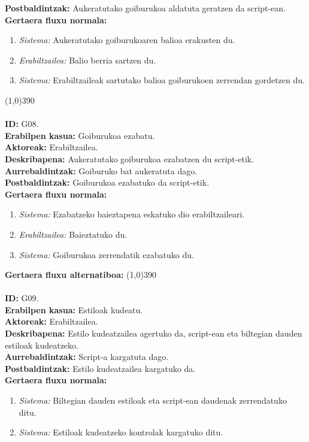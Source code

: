 \textbf{Postbaldintzak:} Aukeratutako goiburukoa aldatuta geratzen da script-ean.\\
\textbf{Gertaera fluxu normala:}
\begin{enumerate}
	\item \textit{Sistema:} Aukeratutako goiburukoaren balioa erakusten du.
	\item \textit{Erabiltzailea:} Balio berria sartzen du.
	\item \textit{Sistema:} Erabiltzaileak sartutako balioa goiburukoen zerrendan gordetzen du.
\end{enumerate}
\line(1,0){390}\\
\noindent\\
\textbf{ID:} G08.\\
\textbf{Erabilpen kasua:} Goiburukoa ezabatu.\\
\textbf{Aktoreak:} Erabiltzailea.\\
\textbf{Deskribapena:} Aukeratutako goiburukoa ezabatzen du script-etik.\\
\textbf{Aurrebaldintzak:} Goiburuko bat aukeratuta dago.\\
\textbf{Postbaldintzak:} Goiburukoa ezabatuko da script-etik.\\
\textbf{Gertaera fluxu normala:}
\begin{enumerate}
	\item \textit{Sistema:} Ezabatzeko baieztapena eskatuko dio erabiltzaileari.
	\item \textit{Erabiltzailea:} Baieztatuko du.
	\item \textit{Sistema:} Goiburukoa zerrendatik ezabatuko du.
\end{enumerate}
\textbf{Gertaera fluxu alternatiboa:}
\line(1,0){390}\\
\noindent\\
\textbf{ID:} G09.\\
\textbf{Erabilpen kasua:} Estiloak kudeatu.\\
\textbf{Aktoreak:} Erabiltzailea.\\
\textbf{Deskribapena:} Estilo kudeatzailea agertuko da, script-ean eta biltegian dauden estiloak kudeatzeko.\\
\textbf{Aurrebaldintzak:} Script-a kargatuta dago.\\
\textbf{Postbaldintzak:} Estilo kudeatzailea kargatuko da.\\
\textbf{Gertaera fluxu normala:}
\begin{enumerate}
	\item \textit{Sistema:} Biltegian dauden estiloak eta script-ean daudenak zerrendatuko ditu.
	\item \textit{Sistema:} Estiloak kudeatzeko kontrolak kargatuko ditu.
\end{enumerate}
